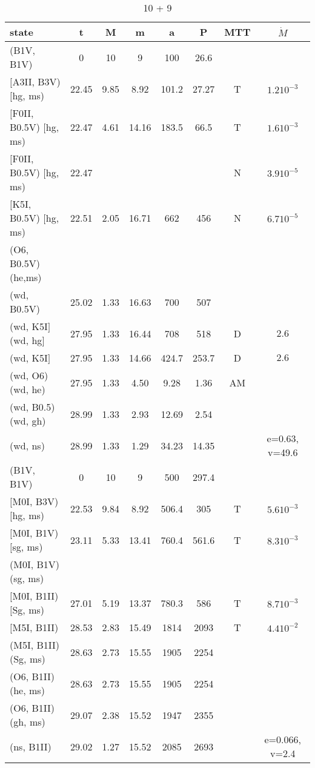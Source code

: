 \documentclass{article}
\begin{document}
\begin{table}
\caption{ 10 + 9}
\begin{tabular}{p{4cm}ccccccc}
\hline
state 		    	& t 	& M	& m	& a	& P	& MTT	&$\dot{M}$		\\ \hline 
(B1V, B1V)	 	& 0	& 10	& 9	& 100	& 26.6	&	&			\\
$[$A3II, B3V) $[$hg, ms)	& 22.45	& 9.85	& 8.92	& 101.2	& 27.27	& T	& $1.2 10^{-3}$		\\
$[$F0II, B0.5V) $[$hg, ms)	& 22.47	& 4.61	& 14.16	& 183.5	& 66.5	& T	& $1.6 10^{-3}$		\\
$[$F0II, B0.5V) $[$hg, ms)	& 22.47	& 	&	&	&	& N	& $3.9 10^{-5}$		\\
$[$K5I, B0.5V) $[$hg, ms)	& 22.51	& 2.05	& 16.71	& 662	& 456	& N	& $6.7 10^{-5}$		\\
(O6, B0.5V) (he,ms)	&      	&     	&	&	&	&	&			\\
(wd, B0.5V)	 	& 25.02	& 1.33	& 16.63	& 700	& 507	&	&			\\
(wd, K5I$]$ (wd, hg$]$	& 27.95	& 1.33	& 16.44	& 708	& 518	& D	& $2.6$			\\
(wd, K5I$]$	 	& 27.95	& 1.33	& 14.66	& 424.7 & 253.7	& D	& $2.6$			\\
(wd, O6) (wd, he)	& 27.95	& 1.33	& 4.50	& 9.28	& 1.36	& AM	&			\\
(wd, B0.5) (wd, gh)	& 28.99	& 1.33	& 2.93	& 12.69	& 2.54	&	&			\\
(wd, ns)	 	& 28.99	& 1.33	& 1.29	& 34.23	& 14.35	&	& e=0.63, v=49.6	\\ \hline
(B1V, B1V)   	 	& 0	& 10 	& 9	& 500	& 297.4	&	&			\\
$[$M0I, B3V) $[$hg, ms)	& 22.53	& 9.84	& 8.92	& 506.4	& 305	& T	& $5.6 10^{-3}$		\\
$[$M0I, B1V) $[$sg, ms)	& 23.11	& 5.33	& 13.41	& 760.4 & 561.6	& T	& $8.3 10^{-3}$		\\
(M0I, B1V) (sg, ms)	& 	& 	&	&	&	&	&			\\
$[$M0I, B1II) $[$Sg, ms)	& 27.01	& 5.19	& 13.37	& 780.3	& 586  	& T	& $8.7 10^{-3}$		\\
$[$M5I, B1II)	 	& 28.53	& 2.83	& 15.49	& 1814	& 2093	& T	& $4.4 10^{-2}$		\\
(M5I, B1II) (Sg, ms)	& 28.63	& 2.73	& 15.55	& 1905	& 2254	&	&			\\
(O6, B1II) (he, ms)	& 28.63	& 2.73	& 15.55	& 1905	& 2254	&	&			\\
(O6, B1II) (gh, ms)	& 29.07	& 2.38	& 15.52	& 1947	& 2355	&	&			\\
(ns, B1II)	 	& 29.02	& 1.27	& 15.52	& 2085	& 2693	&	& e=0.066, v=2.4	\\

\end{tabular}
\end{table}
\end{document}
